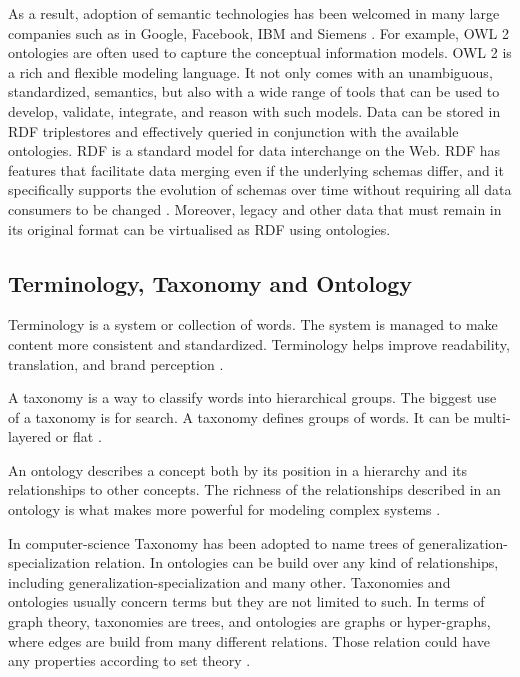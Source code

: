 As a result, adoption of semantic technologies has been welcomed in many large companies such as in Google, Facebook, IBM \cite{SemanticTechnologiesInIBM}
and Siemens \cite{CapturingIndustrialInformationWithOntologies}.
For example, OWL 2 ontologies are often used to capture the conceptual information models.
OWL 2 is a rich and flexible modeling language. It not only comes with an
unambiguous, standardized, semantics, but also with a wide range of tools that can be used to
develop, validate, integrate, and reason with such models.
Data can be stored in RDF triplestores and effectively queried in conjunction with the available ontologies.
RDF is a standard model for data interchange on the Web.
RDF has features that facilitate data merging even if the underlying schemas differ,
and it specifically supports the evolution of schemas over time
without requiring all data consumers to be changed \cite{RDF}.
Moreover, legacy and other data that must remain in its original format can be virtualised as RDF using ontologies.

\subsection{Terminology, Taxonomy and Ontology}
Terminology is a system or collection of words. The system is managed to make content more consistent and standardized. Terminology helps improve readability, translation, and brand perception \cite{TaxonomyVSTerminology}.

A taxonomy is a way to classify words into hierarchical groups. The biggest use of a taxonomy is for search.
A taxonomy defines groups of words. It can be multi-layered or flat \cite{TaxonomyVSTerminology}.

An ontology describes a concept both by its position in a hierarchy and its relationships to other concepts. The richness of the relationships described in an ontology is what makes more powerful for modeling complex systems \cite{OntologyHasRicherRelationshipThanTaxonomy}.

In computer-science Taxonomy has been adopted to name trees of generalization-specialization relation. In ontologies can be build over any kind of relationships, including generalization-specialization and many other.
Taxonomies and ontologies usually concern terms but they are not limited to such. In terms of graph theory, taxonomies are trees, and ontologies are graphs or hyper-graphs, where edges are build from many different relations. Those relation could have any properties according to set theory \cite{taxonomiesRtreesOntologiesRgraphs}.


